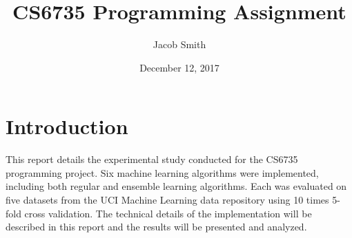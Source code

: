 \documentclass[11pt]{article}
\title{CS6735 Programming Assignment}
\author{Jacob Smith}
\date{December 12, 2017}
\begin{document}
\maketitle

\section{Introduction}
This report details the experimental study conducted for the CS6735 programming project. Six machine learning algorithms were implemented, including both regular and ensemble learning algorithms. Each was evaluated on five datasets from the UCI Machine Learning data repository using 10 times 5-fold cross validation. The technical details of the implementation will be described in this report and the results will be presented and analyzed.
\end{document}
